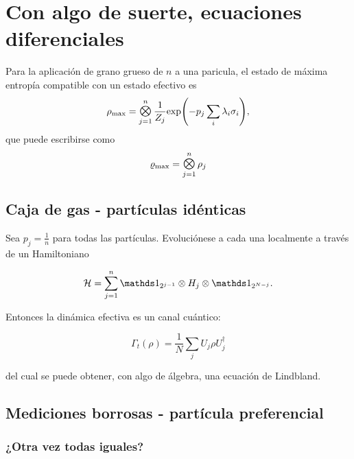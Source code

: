 \chapter{Con algo de suerte, ecuaciones diferenciales}

Para la aplicación de grano grueso de $n$ a una paricula, el estado de máxima entropía compatible con un estado efectivo es
\begin{equation}\label{eq:GeneralMaxEnt}
    \rho_{\max}=\Motimes_{j=1}^{n}\frac{1}{Z_{j}}\text{exp}\qty(-p_{j}\sum_{i}\lambda_{i}\sigma_{i}),
\end{equation}
que puede escribirse como
\begin{equation*}
    \varrho_{\max}=\Motimes_{j=1}^{n}\rho_{j}
\end{equation*}

\section{Caja de gas - partículas idénticas}

Sea $p_{j}=\frac{1}{n}$ para todas las partículas. Evoluciónese a cada una localmente a través de un Hamiltoniano

\begin{equation*}
    \mcH=\sum_{j=1}^{n}\Id_{2^{j-1}}\otimes H_{j} \otimes \Id_{2^{N-j}}.
\end{equation*}

Entonces la dinámica efectiva es un canal cuántico:

\begin{equation*}
    \Gamma_{t}(\rho)=\frac{1}{N}\sum_{j}U_{j}\rho U_{j}^{\dag}
\end{equation*}

del cual se puede obtener, con algo de álgebra, una ecuación de Lindbland.

\section{Mediciones borrosas - partícula preferencial}

\subsection{¿Otra vez todas iguales?}

